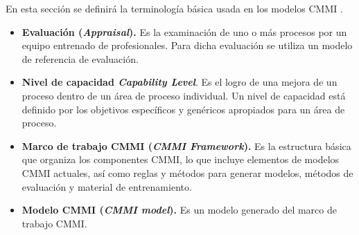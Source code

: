 En esta sección se definirá la terminología básica usada en los modelos CMMI \cite{term}.

 
\begin{itemize}
\item \textbf{Evaluación (\textit{Appraisal}).} Es la examinación de uno o más procesos por un equipo entrenado de profesionales. Para dicha evaluación se utiliza un modelo de referencia de evaluación.
\item \textbf{Nivel de capacidad \textit{Capability Level}}. Es el logro de una mejora de un proceso dentro de un área de proceso individual. Un nivel de capacidad está definido por los objetivos específicos y genéricos apropiados para un área de proceso.
\item \textbf{Marco de trabajo CMMI (\textit{CMMI Framework}).} Es la estructura básica que organiza los componentes CMMI, lo que incluye elementos de modelos CMMI actuales, así como reglas y métodos para generar modelos, métodos de evaluación y material de entrenamiento.
\item \textbf{Modelo CMMI (\textit{CMMI model}).} Es un modelo generado del marco de trabajo CMMI.

\end{itemize}
